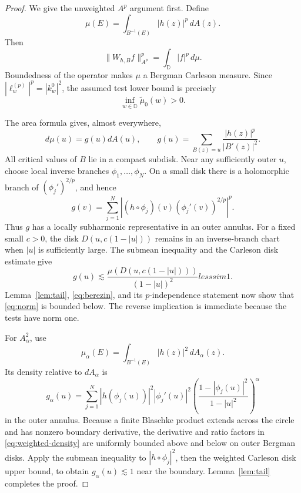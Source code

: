 \documentclass[11pt]{article}
\newcommand{\D}{\mathbb D}
\begin{document}
\begin{proof}
We give the unweighted $A^p$ argument first.  Define
\begin{equation}\label{eq:mu}
 \mu(E)=\int_{B^{-1}(E)}|h(z)|^p\,dA(z).
\end{equation}
Then
\begin{equation}\label{eq:norm}
 \|W_{h,B}f\|_{A^p}^p=\int_\D |f|^p\,d\mu.
\end{equation}
Boundedness of the operator makes $\mu$ a Bergman Carleson measure.  Since
$|\ell_w^{(p)}|^p=|k_w^0|^2$, the assumed test lower bound is precisely
\begin{equation}\label{eq:berezin}
 \inf_{w\in\D}\widetilde\mu_0(w)>0.
\end{equation}

The area formula gives, almost everywhere,
\begin{equation}\label{eq:density}
 d\mu(u)=g(u)dA(u),\qquad
 g(u)=\sum_{B(z)=u}\frac{|h(z)|^p}{|B'(z)|^2}.
\end{equation}
All critical values of $B$ lie in a compact subdisk.  Near any sufficiently
outer $u$, choose local inverse branches $\phi_1,\ldots,\phi_N$.  On a small
disk there is a holomorphic branch of $(\phi_j')^{2/p}$, and hence
\[
 g(v)=\sum_{j=1}^N
 \left|(h\circ\phi_j)(v)(\phi_j'(v))^{2/p}\right|^p.
\]
Thus $g$ has a locally subharmonic representative in an outer annulus.
For a fixed small $c>0$, the disk
$D(u,c(1-|u|))$ remains in an inverse-branch chart when $|u|$ is sufficiently
large.  The submean inequality and the Carleson disk estimate give
\[
 g(u)\lesssim \frac{\mu(D(u,c(1-|u|)))}{(1-|u|)^2}lesssim1.
\]
Lemma~\ref{lem:tail}, \eqref{eq:berezin}, and its $p$-independence statement
now show that \eqref{eq:norm} is bounded below.  The reverse implication is
immediate because the tests have norm one.

For $A^2_\alpha$, use
\[
 \mu_\alpha(E)=\int_{B^{-1}(E)}|h(z)|^2\,dA_\alpha(z).
\]
Its density relative to $dA_\alpha$ is
\begin{equation}\label{eq:weighted-density}
 g_\alpha(u)=\sum_{j=1}^N |h(\phi_j(u))|^2|\phi_j'(u)|^2
 \left(\frac{1-|\phi_j(u)|^2}{1-|u|^2}\right)^\alpha
\end{equation}
in the outer annulus.  Because a finite Blaschke product extends across the
circle and has nonzero boundary derivative, the derivative and ratio factors
in \eqref{eq:weighted-density} are uniformly bounded above and below on
outer Bergman disks.  Apply the submean inequality to
$|h\circ\phi_j|^2$, then the weighted Carleson disk upper bound, to obtain
$g_\alpha(u)\lesssim1$ near the boundary.  Lemma~\ref{lem:tail} completes
the proof.
\end{proof}
\end{document}
